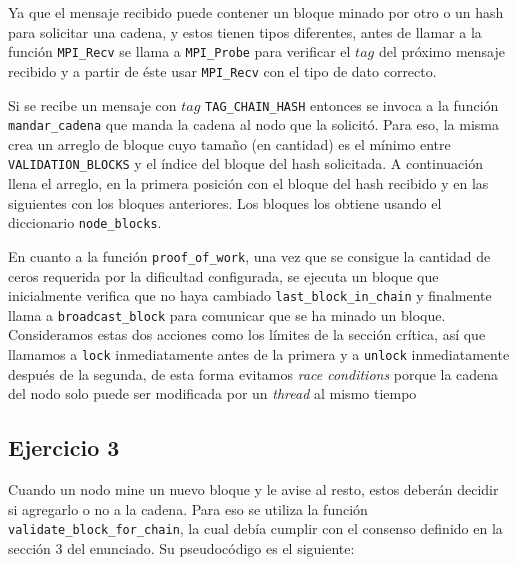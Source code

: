\documentclass[10pt, a4paper, hidelinks]{article}
\begin{document}
Ya que el mensaje recibido puede contener un bloque minado por otro o un hash para solicitar una cadena, y estos tienen tipos diferentes, antes de llamar a la función \texttt{MPI\_Recv} se llama a \texttt{MPI\_Probe} para verificar el $tag$ del próximo mensaje recibido y a partir de éste usar \texttt{MPI\_Recv} con el tipo de dato correcto.

Si se recibe un mensaje con $tag$ \texttt{TAG\_CHAIN\_HASH} entonces se invoca a la función \texttt{mandar\_cadena} que manda la cadena al nodo que la solicitó. Para eso, la misma crea un arreglo de bloque cuyo tamaño (en cantidad) es el mínimo entre \texttt{VALIDATION\_BLOCKS} y el índice del bloque del hash solicitada. A continuación llena el arreglo, en la primera posición con el bloque del hash recibido y en las siguientes con los bloques anteriores. Los bloques los obtiene usando el diccionario \texttt{node\_blocks}.

En cuanto a la función \texttt{proof\_of\_work}, una vez que se consigue la cantidad de ceros requerida por la dificultad configurada, se ejecuta un bloque que inicialmente verifica que no haya cambiado \texttt{last\_block\_in\_chain} y finalmente llama a \texttt{broadcast\_block} para comunicar que se ha minado un bloque. Consideramos estas dos acciones como los límites de la sección crítica, así que llamamos a \texttt{lock} inmediatamente antes de la primera y a \texttt{unlock} inmediatamente después de la segunda, de esta forma evitamos \textit{race conditions} porque la cadena del nodo solo puede ser modificada por un \textit{thread} al mismo tiempo

\subsection{Ejercicio 3}
Cuando un nodo mine un nuevo bloque y le avise al resto, estos deberán decidir si agregarlo o no a la cadena. Para eso se utiliza la función \texttt{validate\_block\_for\_chain}, la cual debía cumplir con el consenso definido en la sección 3 del enunciado. Su pseudocódigo es el siguiente:
\end{document}
